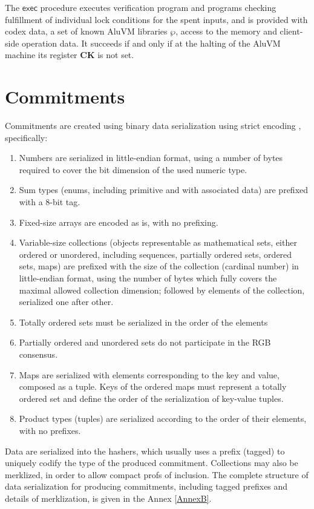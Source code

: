 \documentclass[a4paper]{article}
\begin{document}
\begin{multicols}{2}
The $\mathsf{exec}$ procedure executes verification program and 
programs checking fulfillment of individual lock conditions for the spent inputs,
and is provided with codex data, a set of known AluVM libraries $\wp$,
access to the memory and client-side operation data.
It succeeds if and only if at the halting of the AluVM machine its register \textbf{CK} is not set.

\section{Commitments}\label{Commitments}

Commitments are created using binary data serialization using strict encoding \cite{strict}, specifically:
\begin{enumerate}
\item Numbers are serialized in little-endian format,
   using a number of bytes required to cover the bit dimension of the used numeric type.
\item Sum types (enums, including primitive and with associated data) are prefixed with a 8-bit tag.
\item Fixed-size arrays are encoded as is, with no prefixing.
\item Variable-size collections (objects representable as mathematical sets,
   either ordered or unordered, including sequences, partially ordered sets, ordered sets, maps)
   are prefixed with the size of the collection (cardinal number) in little-endian format,
   using the number of bytes which fully covers the maximal allowed collection dimension;
   followed by elements of the collection, serialized one after other.
\item Totally ordered sets must be serialized in the order of the elements
\item Partially ordered and unordered sets do not participate in the RGB consensus.
\item Maps are serialized with elements corresponding to the key and value, composed as a tuple.
   Keys of the ordered maps must represent a totally ordered set and
   define the order of the serialization of key-value tuples.
\item Product types (tuples) are serialized according to the order of their elements, with no prefixes.
\end{enumerate}

Data are serialized into the hashers, which usually uses a prefix (tagged) to uniquely codify
the type of the produced commitment. Collections may also be merklized, in order to allow
compact profs of inclusion. The complete structure of data serialization for producing commitments,
including tagged prefixes and details of merklization, is given in the Annex \ref{AnnexB}.



\end{multicols}
\end{document}
